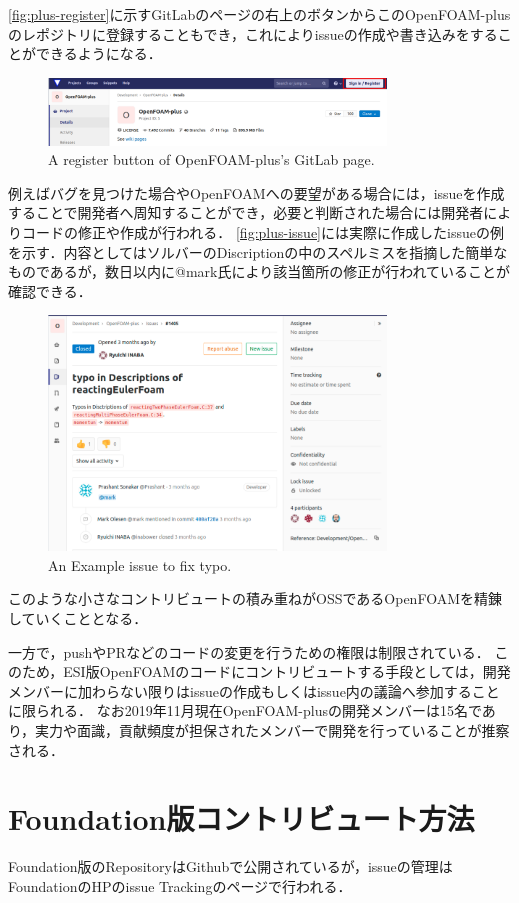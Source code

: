 \documentclass{ltjoc}
\begin{document}
\autoref{fig:plus-register}に示すGitLabのページの右上のボタンからこのOpenFOAM-plusのレポジトリに登録することもでき，これによりissueの作成や書き込みをすることができるようになる．
\begin{figure}[htbp]
\centering
\includegraphics[width=0.8\textwidth]{fig/plus_register.png}
\caption{A register button of OpenFOAM-plus's GitLab page.}
\label{fig:plus-register}
\end{figure}
例えばバグを見つけた場合やOpenFOAMへの要望がある場合には，issueを作成することで開発者へ周知することができ，必要と判断された場合には開発者によりコードの修正や作成が行われる．
\autoref{fig:plus-issue}には実際に作成したissueの例を示す．内容としてはソルバーのDiscriptionの中のスペルミスを指摘した簡単なものであるが，数日以内に@mark氏により該当箇所の修正が行われていることが確認できる．
\begin{figure}[htbp]
\centering
\includegraphics[width=0.8\textwidth]{fig/plus_issue.png}
\caption{An Example issue to fix typo.}
\label{fig:plus-issue}
\end{figure}
このような小さなコントリビュートの積み重ねがOSSであるOpenFOAMを精錬していくこととなる．

一方で，pushやPRなどのコードの変更を行うための権限は制限されている．
このため，ESI版OpenFOAMのコードにコントリビュートする手段としては，開発メンバーに加わらない限りはissueの作成もしくはissue内の議論へ参加することに限られる．
なお2019年11月現在OpenFOAM-plusの開発メンバーは15名であり，実力や面識，貢献頻度が担保されたメンバーで開発を行っていることが推察される．\cite{URL:GitLab-plus-members}
%
\section{Foundation版コントリビュート方法}
Foundation版のRepositoryはGithubで公開されているが，issueの管理はFoundationのHPのissue Trackingのページで行われる．
\end{document}
